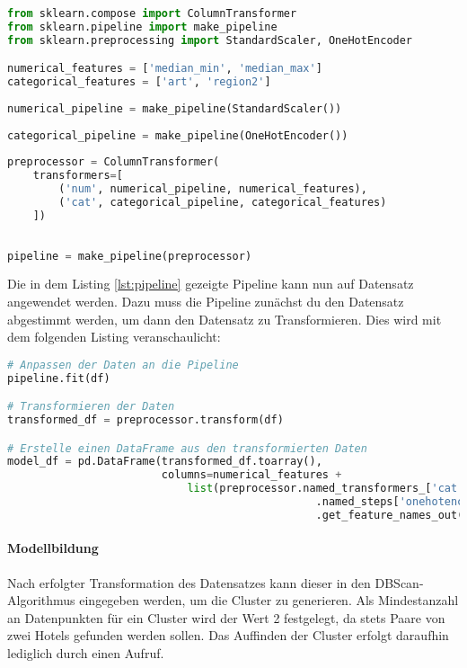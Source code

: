 \begin{lstlisting}[language=Python, label=lst:pipeline, caption=Datensatz Pipeline]
from sklearn.compose import ColumnTransformer
from sklearn.pipeline import make_pipeline
from sklearn.preprocessing import StandardScaler, OneHotEncoder

numerical_features = ['median_min', 'median_max']
categorical_features = ['art', 'region2']
    
numerical_pipeline = make_pipeline(StandardScaler())
    
categorical_pipeline = make_pipeline(OneHotEncoder())
    
preprocessor = ColumnTransformer(
    transformers=[
        ('num', numerical_pipeline, numerical_features),
        ('cat', categorical_pipeline, categorical_features)
    ])
    
    
pipeline = make_pipeline(preprocessor)
\end{lstlisting}

Die in dem Listing \ref{lst:pipeline} gezeigte Pipeline kann nun auf Datensatz angewendet werden. Dazu muss die Pipeline zunächst du den Datensatz abgestimmt werden, um dann den Datensatz zu Transformieren. Dies wird mit dem folgenden Listing veranschaulicht:

\begin{lstlisting}[language=Python, label=lst:pipeline2, caption=Ausführung der Pipeline auf dem Datensatz]
# Anpassen der Daten an die Pipeline
pipeline.fit(df)

# Transformieren der Daten
transformed_df = preprocessor.transform(df)

# Erstelle einen DataFrame aus den transformierten Daten
model_df = pd.DataFrame(transformed_df.toarray(), 
                        columns=numerical_features + 
                            list(preprocessor.named_transformers_['cat']
                                                .named_steps['onehotencoder']
                                                .get_feature_names_out(categorical_features)))
\end{lstlisting}

\paragraph{Modellbildung} 
Nach erfolgter Transformation des Datensatzes kann dieser in den DBScan-Algorithmus eingegeben werden, um die Cluster zu generieren. Als Mindestanzahl an Datenpunkten für ein Cluster wird der Wert 2 festgelegt, da stets Paare von zwei Hotels gefunden werden sollen. Das Auffinden der Cluster erfolgt daraufhin lediglich durch einen Aufruf.

